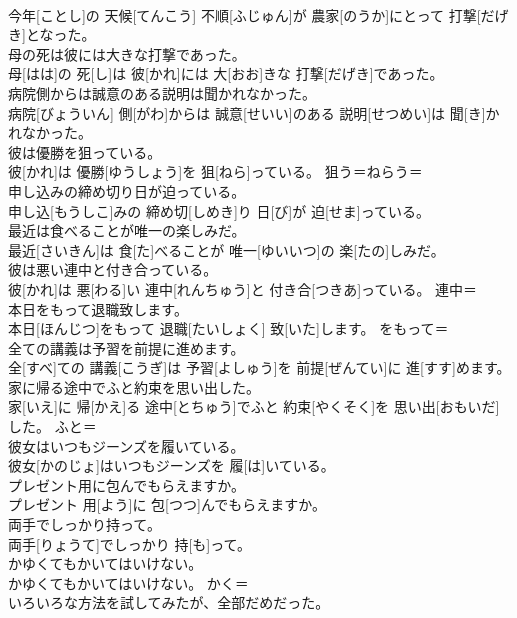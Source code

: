 \documentclass[8pt]{extreport}
\begin{document}
\begin{CJK}{UTF8}{min}
\\	今年[ことし]の 天候[てんこう] 不順[ふじゅん]が 農家[のうか]にとって 打撃[だげき]となった。	
\\	母の死は彼には大きな打撃であった。	
\\	母[はは]の 死[し]は 彼[かれ]には 大[おお]きな 打撃[だげき]であった。	
\\	病院側からは誠意のある説明は聞かれなかった。	
\\	病院[びょういん] 側[がわ]からは 誠意[せいい]のある 説明[せつめい]は 聞[き]かれなかった。	
\\	彼は優勝を狙っている。	
\\	彼[かれ]は 優勝[ゆうしょう]を 狙[ねら]っている。	狙う＝ねらう＝ 
\\	申し込みの締め切り日が迫っている。	
\\	申し込[もうしこ]みの 締め切[しめき]り 日[び]が 迫[せま]っている。	
\\	最近は食べることが唯一の楽しみだ。	
\\	最近[さいきん]は 食[た]べることが 唯一[ゆいいつ]の 楽[たの]しみだ。	
\\	彼は悪い連中と付き合っている。	
\\	彼[かれ]は 悪[わる]い 連中[れんちゅう]と 付き合[つきあ]っている。	連中＝ 
\\	本日をもって退職致します。	
\\	本日[ほんじつ]をもって 退職[たいしょく] 致[いた]します。	をもって＝ 
\\	全ての講義は予習を前提に進めます。	
\\	全[すべ]ての 講義[こうぎ]は 予習[よしゅう]を 前提[ぜんてい]に 進[すす]めます。	
\\	家に帰る途中でふと約束を思い出した。	
\\	家[いえ]に 帰[かえ]る 途中[とちゅう]でふと 約束[やくそく]を 思い出[おもいだ]した。	ふと＝ 
\\	彼女はいつもジーンズを履いている。	
\\	彼女[かのじょ]はいつもジーンズを 履[は]いている。	
\\	プレゼント用に包んでもらえますか。	
\\	プレゼント 用[よう]に 包[つつ]んでもらえますか。	
\\	両手でしっかり持って。	
\\	両手[りょうて]でしっかり 持[も]って。	
\\	かゆくてもかいてはいけない。	
\\	かゆくてもかいてはいけない。	かく＝ 
\\	いろいろな方法を試してみたが、全部だめだった。	

\end{CJK}
\end{document}
